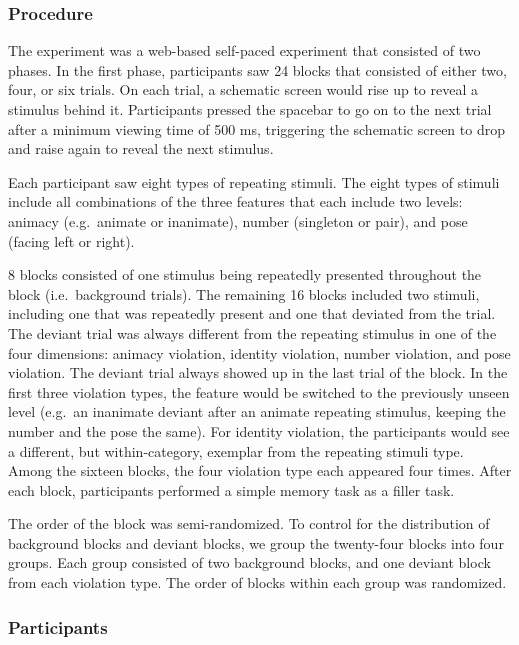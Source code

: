 \documentclass[10pt, letterpaper]{article}
\begin{document}
\hypertarget{procedure}{%
\subsubsection{Procedure}\label{procedure}}

The experiment was a web-based self-paced experiment that consisted of
two phases. In the first phase, participants saw 24 blocks that
consisted of either two, four, or six trials. On each trial, a schematic
screen would rise up to reveal a stimulus behind it. Participants
pressed the spacebar to go on to the next trial after a minimum viewing
time of 500 ms, triggering the schematic screen to drop and raise again
to reveal the next stimulus.

Each participant saw eight types of repeating stimuli. The eight types
of stimuli include all combinations of the three features that each
include two levels: animacy (e.g.~animate or inanimate), number
(singleton or pair), and pose (facing left or right).

8 blocks consisted of one stimulus being repeatedly presented throughout
the block (i.e.~background trials). The remaining 16 blocks included two
stimuli, including one that was repeatedly present and one that deviated
from the trial. The deviant trial was always different from the
repeating stimulus in one of the four dimensions: animacy violation,
identity violation, number violation, and pose violation. The deviant
trial always showed up in the last trial of the block. In the first
three violation types, the feature would be switched to the previously
unseen level (e.g.~an inanimate deviant after an animate repeating
stimulus, keeping the number and the pose the same). For identity
violation, the participants would see a different, but within-category,
exemplar from the repeating stimuli type. Among the sixteen blocks, the
four violation type each appeared four times. After each block,
participants performed a simple memory task as a filler task.

The order of the block was semi-randomized. To control for the
distribution of background blocks and deviant blocks, we group the
twenty-four blocks into four groups. Each group consisted of two
background blocks, and one deviant block from each violation type. The
order of blocks within each group was randomized.

\hypertarget{participants}{%
\subsubsection{Participants}\label{participants}}
\end{document}
